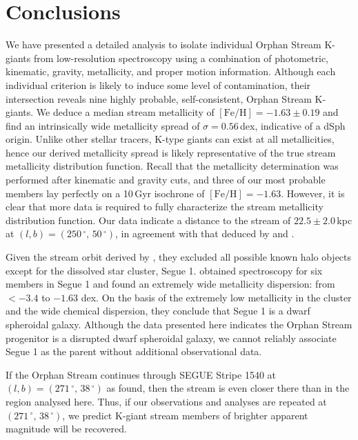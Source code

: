 \section{Conclusions}
\label{sec:ch2-conclusions}

We have presented a detailed analysis to isolate individual Orphan Stream K-giants from low-resolution spectroscopy using a combination of photometric, kinematic, gravity, metallicity, and proper motion information. Although each individual criterion is likely to induce some level of contamination, their intersection reveals nine highly probable, self-consistent, Orphan Stream K-giants.  We deduce a median stream metallicity of $[\mbox{Fe/H}] = -1.63 \pm 0.19$ and find an intrinsically wide metallicity spread of $\sigma = 0.56$\,dex, indicative of a dSph origin. Unlike other stellar tracers, K-type giants can exist at all metallicities, hence our derived metallicity spread is likely representative of the true stream metallicity distribution function. Recall that the metallicity determination was performed after kinematic and gravity cuts, and three of our most probable members lay perfectly on a 10\,Gyr isochrone of $[\mbox{Fe/H}] = -1.63$. However, it is clear that more data is required to fully characterize the stream metallicity distribution function. Our data indicate a distance to the stream of $22.5 \pm 2.0$\,kpc at $(l, b) = (250\,^\circ,\,50\,^\circ)$, in agreement with that deduced by \citet{Grillmair_2006} and \citet{Newberg_et-al_2010}.

Given the stream orbit derived by \citet{Newberg_et-al_2010}, they excluded all possible known halo objects except for the dissolved star cluster, Segue 1. \citet{Simon_et-al_2011} obtained spectroscopy for six members in Segue 1 and found an extremely wide metallicity dispersion: from $<-3.4$ to $-1.63$ dex. On the basis of the extremely low metallicity in the cluster and the wide chemical dispersion, they conclude that Segue 1 is a dwarf spheroidal galaxy. Although the data presented here indicates the Orphan Stream progenitor is a disrupted dwarf spheroidal galaxy, we cannot reliably associate Segue 1 as the parent without additional observational data. 

If the Orphan Stream continues through SEGUE Stripe 1540 at $(l, b) = (271\,^\circ,\,38\,^\circ)$ as \citet{Newberg_et-al_2010} found, then the stream is even closer there than in the region analysed here. Thus, if our observations and analyses are repeated at $(271\,^\circ,\,38\,^\circ)$, we predict K-giant stream members of brighter apparent magnitude will be recovered. 

